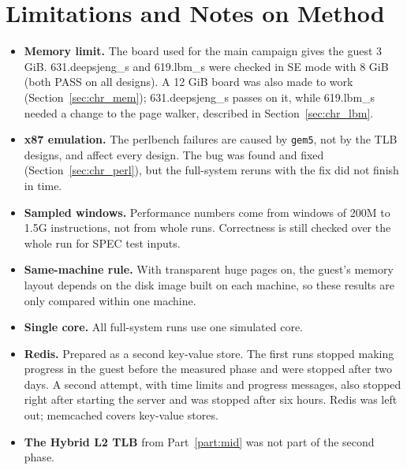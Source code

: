 \section{Limitations and Notes on Method}
\label{sec:limits}
\begin{itemize}
    \item \textbf{Memory limit.} The board used for the main campaign gives the guest 3 GiB. 631.deepsjeng\_s and 619.lbm\_s were checked in SE mode with 8 GiB (both PASS on all designs). A 12 GiB board was also made to work (Section~\ref{sec:chr_mem}); 631.deepsjeng\_s passes on it, while 619.lbm\_s needed a change to the page walker, described in Section~\ref{sec:chr_lbm}.
    \item \textbf{x87 emulation.} The perlbench failures are caused by \texttt{gem5}, not by the TLB designs, and affect every design. The bug was found and fixed (Section~\ref{sec:chr_perl}), but the full-system reruns with the fix did not finish in time.
    \item \textbf{Sampled windows.} Performance numbers come from windows of 200M to 1.5G instructions, not from whole runs. Correctness is still checked over the whole run for SPEC test inputs.
    \item \textbf{Same-machine rule.} With transparent huge pages on, the guest's memory layout depends on the disk image built on each machine, so these results are only compared within one machine.
    \item \textbf{Single core.} All full-system runs use one simulated core.
    \item \textbf{Redis.} Prepared as a second key-value store. The first runs stopped making progress in the guest before the measured phase and were stopped after two days. A second attempt, with time limits and progress messages, also stopped right after starting the server and was stopped after six hours. Redis was left out; memcached covers key-value stores.
    \item \textbf{The Hybrid L2 TLB} from Part~\ref{part:mid} was not part of the second phase.
\end{itemize}


